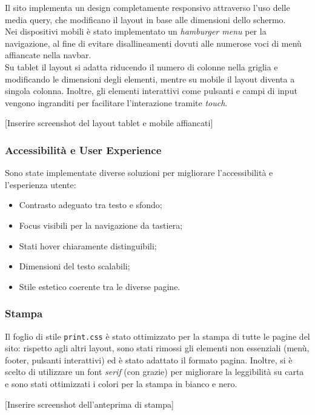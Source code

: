 \documentclass[a4paper, 12pt]{article}
\begin{document}
\begin{justify}
Il sito implementa un design completamente responsivo attraverso l'uso delle media query, che modificano il layout in base alle dimensioni dello schermo.\\
Nei dispositivi mobili è stato implementato un \textit{hamburger menu} per la navigazione, al fine di evitare disallineamenti dovuti alle numerose voci di menù affiancate nella navbar.\\
Su tablet il layout si adatta riducendo il numero di colonne nella griglia e modificando le dimensioni degli elementi, mentre su mobile il layout diventa a singola colonna. Inoltre, gli elementi interattivi come pulsanti e campi di input vengono ingranditi per facilitare l'interazione tramite \textit{touch}.

[Inserire screenshot del layout tablet e mobile affiancati]

\subsubsection{Accessibilità e User Experience}

Sono state implementate diverse soluzioni per migliorare l'accessibilità e l'esperienza utente:
\begin{itemize}
    \item Contrasto adeguato tra testo e sfondo;
    \item Focus visibili per la navigazione da tastiera;
    \item Stati hover chiaramente distinguibili;
    \item Dimensioni del testo scalabili;
    \item Stile estetico coerente tra le diverse pagine.
\end{itemize}

\subsubsection{Stampa}

Il foglio di stile \texttt{print.css} è stato ottimizzato per la stampa di tutte le pagine del sito: rispetto agli altri layout, sono stati rimossi gli elementi non essenziali (menù, footer, pulsanti interattivi) ed è stato adattato il formato pagina. Inoltre, si è scelto di utilizzare un font \textit{serif} (con grazie) per migliorare la leggibilità su carta e sono stati ottimizzati i colori per la stampa in bianco e nero.

[Inserire screenshot dell'anteprima di stampa]



\end{justify}
\end{document}
